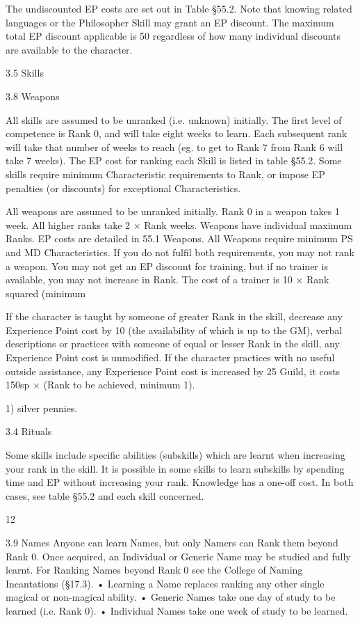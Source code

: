 \documentclass[a4paper]{article}
\begin{document}
\begin{multicols}{3}
The undiscounted EP costs are set out in Table
§55.2. Note that knowing related languages or the
Philosopher Skill may grant an EP discount. The
maximum total EP discount applicable is 50%
regardless of how many individual discounts are
available to the character.

3.5 Skills

3.8 Weapons

All skills are assumed to be unranked (i.e. unknown) initially. The first level of competence is
Rank 0, and will take eight weeks to learn. Each
subsequent rank will take that number of weeks to
reach (eg. to get to Rank 7 from Rank 6 will take 7
weeks). The EP cost for ranking each Skill is listed
in table §55.2. Some skills require minimum Characteristic requirements to Rank, or impose EP
penalties (or discounts) for exceptional Characteristics.

All weapons are assumed to be unranked initially.
Rank 0 in a weapon takes 1 week. All higher ranks
take 2 × Rank weeks. Weapons have individual
maximum Ranks. EP costs are detailed in 55.1
Weapons. All Weapons require minimum PS and
MD Characteristics. If you do not fulfil both requirements, you may not rank a weapon. You may
not get an EP discount for training, but if no trainer
is available, you may not increase in Rank. The
cost of a trainer is 10 × Rank squared (minimum

If the character is taught by someone of greater
Rank in the skill, decrease any Experience Point
cost by 10%
(the availability of which is up to the GM), verbal
descriptions or practices with someone of equal or
lesser Rank in the skill, any Experience Point cost
is unmodified. If the character practices with no
useful outside assistance, any Experience Point
cost is increased by 25%
Guild, it costs 150sp × (Rank to be achieved,
minimum 1).

1) silver pennies.

3.4 Rituals

Some skills include specific abilities (subskills)
which are learnt when increasing your rank in the
skill. It is possible in some skills to learn subskills
by spending time and EP without increasing your
rank. Knowledge has a one-off cost. In both cases,
see table §55.2 and each skill concerned.

12

3.9 Names
Anyone can learn Names, but only Namers can
Rank them beyond Rank 0. Once acquired, an
Individual or Generic Name may be studied and
fully learnt. For Ranking Names beyond Rank 0
see the College of Naming Incantations (§17.3).
• Learning a Name replaces ranking any other
single magical or non-magical ability.
• Generic Names take one day of study to be
learned (i.e. Rank 0).
• Individual Names take one week of study to be
learned.


\end{multicols}
\end{document}
